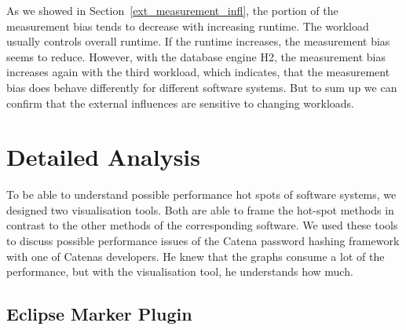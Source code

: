 
As we showed in Section~\ref{ext_measurement_infl}, the portion of the measurement bias tends to decrease with increasing runtime. The workload usually controls overall runtime. If the runtime increases, the measurement bias seems to reduce. However, with the database engine H2, the measurement bias increases again with the third workload, which indicates, that the measurement bias does behave differently for different software systems.
But to sum up we can confirm that the external influences are sensitive to changing workloads.


\section{Detailed Analysis}
\label{delailed_analysis}

To be able to understand possible performance hot spots of software systems, we designed two visualisation tools. Both are able to frame the hot-spot methods in contrast to the other methods of the corresponding software. We used these tools to discuss possible performance issues of the Catena password hashing framework with one of Catenas developers. He knew that the graphs consume a lot of the performance, but with the visualisation tool, he understands how much.






\subsection{Eclipse Marker Plugin}
\label{eclipse_plugin}

